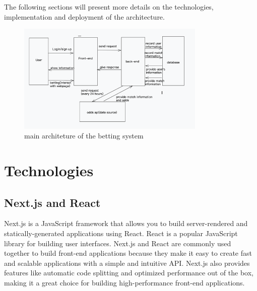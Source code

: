 \documentclass[singlecolumn]{article}
\begin{document}
The following sections will present more details on the technologies, implementation and deployment of the architecture.

\begin{figure}[H]
    \centering
    \includegraphics[width=0.8\textwidth]{architecture.png}
    \caption{main architeture of the betting system}
    \label{fig:architecture}
\end{figure}



\section{Technologies}
\subsection{Next.js and React}

Next.js is a JavaScript framework that allows you to build server-rendered and statically-generated applications using React. React is a popular JavaScript library for building user interfaces. Next.js and React are commonly used together to build front-end applications because they make it easy to create fast and scalable applications with a simple and intuitive API. Next.js also provides features like automatic code splitting and optimized performance out of the box, making it a great choice for building high-performance front-end applications.
\end{document}
